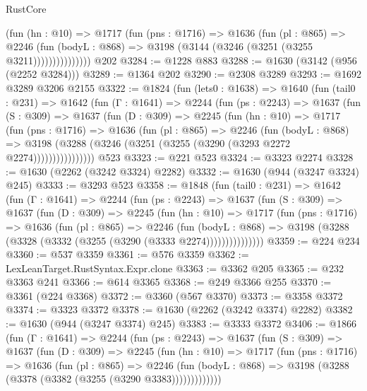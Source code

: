 \begin{lexlean}{RustCore}
\begin{coremodule}
                  (fun (hn : @10) =>
                  @1717
                    (fun (pns : @1716) =>
                    @1636
                      (fun (pl : @865) =>
                      @2246
                        (fun (bodyL : @868) =>
                        @3198 (@3144 (@3246 (@3251 (@3255 @3211)))))))))))))))
    @202
@3284 := @1228 @883
@3288 := @1630 (@3142 (@956 (@2252 @3284)))
@3289 := @1364 @202
@3290 := @2308 @3289
@3293 := @1692 @3289 @3206 @2155
@3322 := @1824
    (fun (lets0 : @1638) =>
    @1640
      (fun (tail0 : @231) =>
      @1642
        (fun (Γ : @1641) =>
        @2244
          (fun (ps : @2243) =>
          @1637
            (fun (S : @309) =>
            @1637
              (fun (D : @309) =>
              @2245
                (fun (hn : @10) =>
                @1717
                  (fun (pns : @1716) =>
                  @1636
                    (fun (pl : @865) =>
                    @2246
                      (fun (bodyL : @868) =>
                      @3198 (@3288 (@3246 (@3251 (@3255 (@3290 (@3293 @2272 @2274))))))))))))))))
    @523
@3323 := @221 @523
@3324 := @3323 @2274
@3328 := @1630 (@2262 (@3242 @3324) @2282)
@3332 := @1630 (@944 (@3247 @3324) @245)
@3333 := @3293 @523
@3358 := @1848
    (fun (tail0 : @231) =>
    @1642
      (fun (Γ : @1641) =>
      @2244
        (fun (ps : @2243) =>
        @1637
          (fun (S : @309) =>
          @1637
            (fun (D : @309) =>
            @2245
              (fun (hn : @10) =>
              @1717
                (fun (pns : @1716) =>
                @1636
                  (fun (pl : @865) =>
                  @2246
                    (fun (bodyL : @868) =>
                    @3198 (@3288 (@3328 (@3332 (@3255 (@3290 (@3333 @2274)))))))))))))))
@3359 := @224 @234
@3360 := @537 @3359
@3361 := @576 @3359
@3362 := LexLeanTarget.RustSyntax.Expr.clone
@3363 := @3362 @205
@3365 := @232 @3363 @241
@3366 := @614 @3365
@3368 := @249 @3366 @255
@3370 := @3361 (@224 @3368)
@3372 := @3360 (@567 @3370)
@3373 := @3358 @3372
@3374 := @3323 @3372
@3378 := @1630 (@2262 (@3242 @3374) @2282)
@3382 := @1630 (@944 (@3247 @3374) @245)
@3383 := @3333 @3372
@3406 := @1866
    (fun (Γ : @1641) =>
    @2244
      (fun (ps : @2243) =>
      @1637
        (fun (S : @309) =>
        @1637
          (fun (D : @309) =>
          @2245
            (fun (hn : @10) =>
            @1717
              (fun (pns : @1716) =>
              @1636
                (fun (pl : @865) =>
                @2246
                  (fun (bodyL : @868) => @3198 (@3288 (@3378 (@3382 (@3255 (@3290 @3383)))))))))))))

\end{coremodule}
\end{lexlean}
